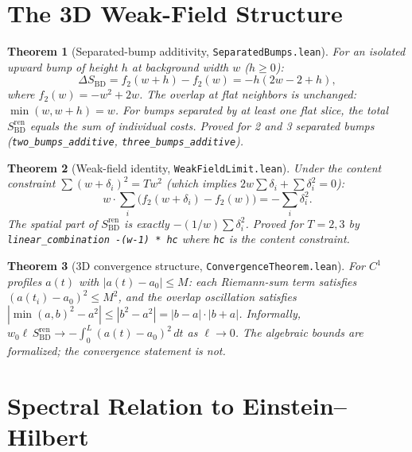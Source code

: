 \documentclass[11pt,a4paper]{article}
\newtheorem{theorem}{Theorem}[section]
\theoremstyle{remark}
\begin{document}
\section{The 3D Weak-Field Structure}

\begin{theorem}[Separated-bump additivity, \texttt{SeparatedBumps.lean}]
\label{thm:bumps}
For an isolated upward bump of height $h$ at background width $w$ ($h \geq 0$):
\[
  \Delta S_{\mathrm{BD}} = f_2(w{+}h) - f_2(w) = -h(2w{-}2{+}h),
\]
where $f_2(w) = -w^2 + 2w$. The overlap at flat neighbors is unchanged:
$\min(w, w{+}h) = w$. For bumps separated by at least one flat slice,
the total $S_{\mathrm{BD}}^{\mathrm{ren}}$ equals the sum of individual costs.
Proved for 2 and 3 separated bumps (\texttt{two\_bumps\_additive},
\texttt{three\_bumps\_additive}).
\end{theorem}

\begin{theorem}[Weak-field identity, \texttt{WeakFieldLimit.lean}]
\label{thm:weakfield}
Under the content constraint $\sum(w{+}\delta_i)^2 = Tw^2$
(which implies $2w\sum\delta_i + \sum\delta_i^2 = 0$):
\begin{equation}
  w \cdot \sum_i \bigl(f_2(w{+}\delta_i) - f_2(w)\bigr) = -\sum_i \delta_i^2.
\end{equation}
The spatial part of $S_{\mathrm{BD}}^{\mathrm{ren}}$ is exactly $-(1/w)\sum\delta_i^2$.
Proved for $T = 2, 3$ by \texttt{linear\_combination -(w-1) * hc} where
\texttt{hc} is the content constraint.
\end{theorem}

\begin{theorem}[3D convergence structure, \texttt{ConvergenceTheorem.lean}]
\label{thm:3dconv}
For $C^1$ profiles $a(t)$ with $|a(t) - a_0| \leq M$: each Riemann-sum term
satisfies $(a(t_i) - a_0)^2 \leq M^2$, and the overlap oscillation satisfies
$|\min(a,b)^2 - a^2| \leq |b^2 - a^2| = |b-a| \cdot |b+a|$.
Informally, $w_0 \ell\, S_{\mathrm{BD}}^{\mathrm{ren}} \to -\int_0^L (a(t){-}a_0)^2\,dt$
as $\ell \to 0$. The algebraic bounds are formalized; the convergence statement
is not.
\end{theorem}

\section{Spectral Relation to Einstein--Hilbert}\label{sec:spectral}
\end{document}
